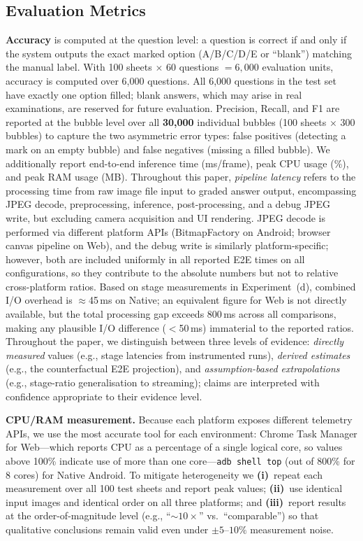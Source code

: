 \documentclass[conference]{IEEEtran}
\begin{document}
\subsection{Evaluation Metrics}

\textbf{Accuracy} is computed at the question level: a question is
correct if and only if the system outputs the exact marked option
(A/B/C/D/E or ``blank'') matching the manual label.
With 100 sheets $\times$ 60 questions $= 6{,}000$ evaluation units,
accuracy is computed over 6,000 questions.
All 6,000 questions in the test set have exactly one option filled;
blank answers, which may arise in real examinations, are reserved for
future evaluation.
Precision, Recall, and F1 are reported at the bubble level over all
\textbf{30,000} individual bubbles (100 sheets $\times$ 300 bubbles)
to capture the two asymmetric error types: false positives (detecting a
mark on an empty bubble) and false negatives (missing a filled bubble).
We additionally report end-to-end inference time (ms/frame), peak CPU
usage (\%), and peak RAM usage (MB).
Throughout this paper, \emph{pipeline latency} refers to the processing
time from raw image file input to graded answer output, encompassing
JPEG decode, preprocessing, inference, post-processing, and a debug
JPEG write, but excluding camera acquisition and UI rendering.
JPEG decode is performed via different platform APIs (BitmapFactory on
Android; browser canvas pipeline on Web), and the debug write is
similarly platform-specific; however, both are included uniformly in
all reported E2E times on all configurations, so they contribute to
the absolute numbers but not to relative cross-platform ratios.
Based on stage measurements in Experiment~(d), combined I/O overhead
is $\approx$45\,ms on Native; an equivalent figure for Web is not
directly available, but the total processing gap exceeds 800\,ms
across all comparisons, making any plausible I/O difference
($<$50\,ms) immaterial to the reported ratios.
Throughout the paper, we distinguish between three levels of evidence:
\emph{directly measured} values (e.g., stage latencies from instrument\-ed
runs), \emph{derived estimates} (e.g., the counterfactual E2E projection),
and \emph{assumption-based extrapolations} (e.g., stage-ratio generalisation
to streaming); claims are interpreted with confidence appropriate to
their evidence level.

\textbf{CPU/RAM measurement.}
Because each platform exposes different telemetry APIs, we use the most
accurate tool for each environment:
Chrome Task Manager for Web---which reports CPU as a percentage of a
single logical core, so values above 100\% indicate use of more than
one core---\texttt{adb shell top} (out of 800\% for 8 cores) for
Native Android.
To mitigate heterogeneity we \textbf{(i)}~repeat each measurement over
all 100 test sheets and report peak values; \textbf{(ii)}~use identical
input images and identical order on all three platforms; and
\textbf{(iii)}~report results at the order-of-magnitude level
(e.g., ``$\sim10\times$'' vs.\ ``comparable'') so that qualitative
conclusions remain valid even under $\pm5$--$10\%$ measurement noise.
\end{document}
